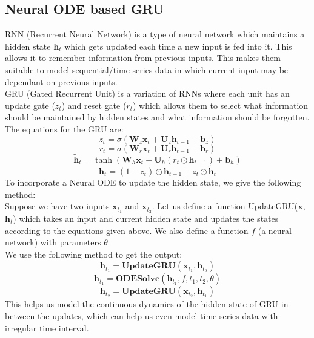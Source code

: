 \documentclass[12pt]{article}
\begin{document}
		\subsection{Neural ODE based GRU}
			\footnotesize{RNN (Recurrent Neural Network) is a type of neural network which maintains a hidden state $\mathbf{h}_t$ which gets updated each time a new input is fed into it. This allows it to remember information from previous inputs. This makes them suitable to model sequential/time-series data in which current input may be dependant on previous inputs.
			\\
			GRU (Gated Recurrent Unit) is a variation of RNNs where each unit has an update gate ($z_t$) and reset gate ($r_t$) which allows them to select what information should be maintained by hidden states and what information should be forgotten. The equations for the GRU are:
			\begin{equation}
				z_t = \sigma(\mathbf{W}_z \mathbf{x}_t + \mathbf{U}_z \mathbf{h}_{t-1} + \mathbf{b}_z)
			\end{equation}
			\begin{equation}
				r_t = \sigma(\mathbf{W}_r \mathbf{x}_t + \mathbf{U}_r \mathbf{h}_{t-1} + \mathbf{b}_r)
			\end{equation}
			\begin{equation}
				\tilde{\mathbf{h}}_t = \tanh(\mathbf{W}_h \mathbf{x}_t + \mathbf{U}_h (r_t \odot \mathbf{h}_{t-1}) + \mathbf{b}_h)
			\end{equation}
			\begin{equation}
				\mathbf{h}_t = (1 - z_t) \odot \mathbf{h}_{t-1} + z_t \odot \tilde{\mathbf{h}}_t
			\end{equation}
			To incorporate a Neural ODE to update the hidden state, we give the following method:
			\\
			Suppose we have two inputs $\mathbf{x}_{t_1}$ and $\mathbf{x}_{t_2}$. Let us define a function UpdateGRU($\mathbf{x}$, $\mathbf{h}_t$) which takes an input and current hidden state and updates the states according to the equations given above. We also define a function $f$ (a neural network) with parameters $\theta$
			\\
			We use the following method to get the output:
			\begin{equation*}
				\mathbf{h}_{t_1} = \mathbf{UpdateGRU}(\mathbf{x}_{t_1}, \mathbf{h}_{t_0})
			\end{equation*}
			\begin{equation*}
				\mathbf{h}_{t_1} = \mathbf{ODESolve}(\mathbf{h}_{t_1}, f, t_1, t_2, \theta)
			\end{equation*}
			\begin{equation*}
				\mathbf{h}_{t_2} = \mathbf{UpdateGRU}(\mathbf{x}_{t_2}, \mathbf{h}_{t_1})
			\end{equation*}
			This helps us model the continuous dynamics of the hidden state of GRU in between the updates, which can help us even model time series data with irregular time interval.}
	\newpage
\end{document}
